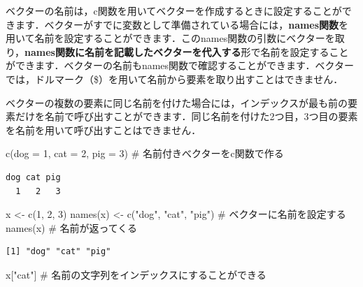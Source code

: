 \documentclass[
  letterpaper,
  DIV=11,
  numbers=noendperiod]{scrreprt}
\newenvironment{Shaded}{\begin{snugshade}}{\end{snugshade}}
\newcommand{\AttributeTok}[1]{\textcolor[rgb]{0.40,0.45,0.13}{#1}}
\newcommand{\CommentTok}[1]{\textcolor[rgb]{0.37,0.37,0.37}{#1}}
\newcommand{\DecValTok}[1]{\textcolor[rgb]{0.68,0.00,0.00}{#1}}
\newcommand{\FunctionTok}[1]{\textcolor[rgb]{0.28,0.35,0.67}{#1}}
\newcommand{\NormalTok}[1]{\textcolor[rgb]{0.00,0.23,0.31}{#1}}
\newcommand{\OtherTok}[1]{\textcolor[rgb]{0.00,0.23,0.31}{#1}}
\newcommand{\StringTok}[1]{\textcolor[rgb]{0.13,0.47,0.30}{#1}}
\begin{document}
ベクターの名前は，c関数を用いてベクターを作成するときに設定することができます．ベクターがすでに変数として準備されている場合には，\textbf{names関数}を用いて名前を設定することができます．このnames関数の引数にベクターを取り，\textbf{names関数に名前を記載したベクターを代入する}形で名前を設定することができます．ベクターの名前もnames関数で確認することができます．ベクターでは，ドルマーク（\$）を用いて名前から要素を取り出すことはできません．

ベクターの複数の要素に同じ名前を付けた場合には，インデックスが最も前の要素だけを名前で呼び出すことができます．同じ名前を付けた2つ目，3つ目の要素を名前を用いて呼び出すことはできません．

\begin{Shaded}
\begin{Highlighting}[]
\FunctionTok{c}\NormalTok{(}\AttributeTok{dog =} \DecValTok{1}\NormalTok{, }\AttributeTok{cat =} \DecValTok{2}\NormalTok{, }\AttributeTok{pig =} \DecValTok{3}\NormalTok{) }\CommentTok{\# 名前付きべクターをc関数で作る}
\end{Highlighting}
\end{Shaded}

\begin{verbatim}
dog cat pig 
  1   2   3 
\end{verbatim}

\begin{Shaded}
\begin{Highlighting}[]
\NormalTok{x }\OtherTok{\textless{}{-}} \FunctionTok{c}\NormalTok{(}\DecValTok{1}\NormalTok{, }\DecValTok{2}\NormalTok{, }\DecValTok{3}\NormalTok{)}
\FunctionTok{names}\NormalTok{(x) }\OtherTok{\textless{}{-}} \FunctionTok{c}\NormalTok{(}\StringTok{"dog"}\NormalTok{, }\StringTok{"cat"}\NormalTok{, }\StringTok{"pig"}\NormalTok{) }\CommentTok{\# ベクターに名前を設定する}
\FunctionTok{names}\NormalTok{(x) }\CommentTok{\# 名前が返ってくる}
\end{Highlighting}
\end{Shaded}

\begin{verbatim}
[1] "dog" "cat" "pig"
\end{verbatim}

\begin{Shaded}
\begin{Highlighting}[]
\NormalTok{x[}\StringTok{"cat"}\NormalTok{] }\CommentTok{\# 名前の文字列をインデックスにすることができる}
\end{Highlighting}
\end{Shaded}
\end{document}

